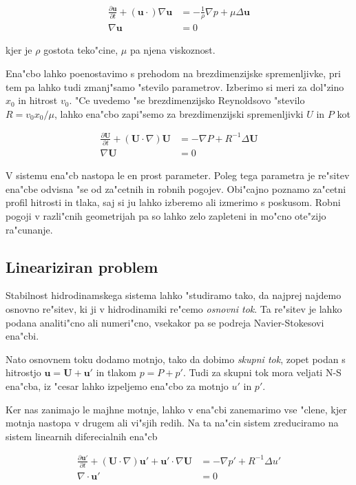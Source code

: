 \documentclass[a4paper,10pt]{article}
\renewcommand{\vec}{\mathbf}
\begin{document}
\begin{align}
 \label{eq:ns-enacba}
\frac{\partial \vec u}{\partial t} + (\vec u \cdot) \nabla \vec u &= -\frac{1}{\rho}\nabla p + \mu \Delta \vec u \\
\nabla \vec u &= 0
\end{align}

kjer je $\rho$ gostota teko"cine, $\mu$ pa njena viskoznost. 

Ena"cbo lahko poenostavimo s prehodom na brezdimenzijske spremenljivke, pri tem pa lahko tudi zmanj"samo "stevilo parametrov. Izberimo si meri za dol"zino $x_0$ in hitrost $v_0$. "Ce uvedemo "se brezdimenzijsko Reynoldsovo "stevilo $R=v_0 x_0 / \mu$, lahko ena"cbo zapi"semo za brezdimenzijski spremenljivki $U$ in $P$ kot

\begin{align}
 \label{eq:ns-brezdim}
\frac{\partial \vec U}{\partial t} + (\vec U \cdot \nabla) \vec U &= -\nabla P + R^{-1} \Delta \vec U \\
\nabla \vec U &= 0
\end{align}

V sistemu ena"cb nastopa le en prost parameter. Poleg tega parametra je re"sitev ena"cbe odvisna "se od za"cetnih in robnih pogojev. Obi"cajno poznamo za"cetni profil hitrosti in tlaka, saj si ju lahko izberemo ali izmerimo s poskusom. Robni pogoji v razli"cnih geometrijah pa so lahko zelo zapleteni in mo"cno ote"zijo ra"cunanje. 

\subsection{Lineariziran problem}

Stabilnost hidrodinamskega sistema lahko "studiramo tako, da najprej najdemo osnovno re"sitev, ki ji v hidrodinamiki re"cemo \emph{osnovni tok}. Ta re"sitev je lahko podana analiti"cno ali numeri"cno, vsekakor pa se podreja Navier-Stokesovi ena"cbi. 

Nato osnovnem toku dodamo motnjo, tako da dobimo \emph{skupni tok}, zopet podan s hitrostjo $\vec u = \vec U + \vec u'$ in tlakom $p = P + p'$. Tudi za skupni tok mora veljati N-S ena"cba, iz "cesar lahko izpeljemo ena"cbo za motnjo $u'$ in $p'$. 

Ker nas zanimajo le majhne motnje, lahko v ena"cbi zanemarimo vse "clene, kjer motnja nastopa v drugem ali vi"sjih redih. Na ta na"cin sistem zreduciramo na sistem linearnih diferecialnih ena"cb 

\begin{align}
 \label{eq:ns-linearna}
\frac{\partial \vec u'}{\partial t} + (\vec U \cdot \nabla) \vec u' + \vec u' \cdot \nabla \vec U &= -\nabla p' + R^{-1}\Delta u' \\
\label{eq:nestisljivost-linearna}
\nabla \cdot \vec u' &= 0
\end{align}
\end{document}
